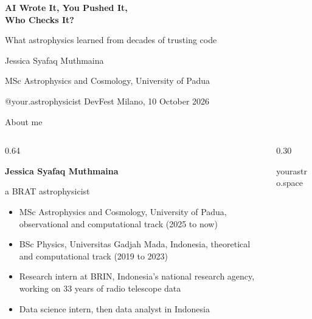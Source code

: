 \documentclass[aspectratio=169,11pt]{beamer}
\begin{document}
{
\begin{frame}[plain]
  \vspace{1.0cm}
  {\raggedright\color{birumuda}\bfseries\fontsize{28}{36}\selectfont AI Wrote It, You Pushed It,\\ Who Checks It?\par}
  \vspace{0.6em}{\color{birumuda}\rule{2.6cm}{1.2pt}}\par\vspace{0.9em}
  {\raggedright\color{white}\large What astrophysics learned from decades of trusting code\par}
  \vspace{1.1cm}
  {\raggedright\color{white}Jessica Syafaq Muthmaina\par}
  \vspace{0.2em}
  {\raggedright\color{white!70!malam}\small MSc Astrophysics and Cosmology, University of Padua\par}
  \vspace{0.2em}
  {\raggedright\ttfamily\scriptsize\color{white!60!malam}@your.astrophysicist \textperiodcentered{} DevFest Milano, 10 October 2026\par}
  \vfill
\end{frame}}

\begin{frame}{About me}
  \begin{columns}[c,onlytextwidth]
    \begin{column}{0.64\textwidth}
      {\raggedright\color{malam}\bfseries Jessica Syafaq Muthmaina\par}
      {\raggedright\small\color{biru}a BRAT astrophysicist\par}
      \vspace{0.35em}
      \small
      \begin{itemize}\setlength{\itemsep}{0.45em}
        \item MSc Astrophysics and Cosmology, University of Padua, observational and computational track (2025 to now)
        \item BSc Physics, Universitas Gadjah Mada, Indonesia, theoretical and computational track (2019 to 2023)
        \item Research intern at BRIN, Indonesia's national research agency, working on 33 years of radio telescope data
        \item Data science intern, then data analyst in Indonesia
      \end{itemize}
    \end{column}
    \begin{column}{0.30\textwidth}
      \centering
      {\color{malam}}\par
      \vspace{0.5em}
      {\ttfamily\small\color{biru}yourastro.space\par}
    \end{column}
  \end{columns}
\end{frame}
\end{document}
